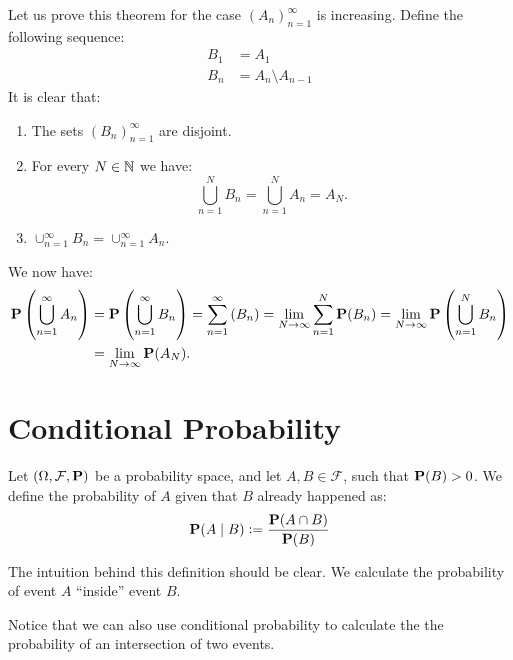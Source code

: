 \documentclass[11pt,a4paper]{article}
\begin{document}
  Let us prove this theorem for the case $(A_n)_{n=1}^{\infty}$ is increasing.
  Define the following sequence:
  \begin{align*}
    B_1 &= A_1 \\
    B_n &= A_n \setminus A_{n-1}
  \end{align*}
  It is clear that:
  \begin{enumerate}
    \item The sets $(B_n)_{n=1}^{\infty}$ are disjoint.
    \item For every $N \in \mathbb{N}$ we have: 
      \[ \bigcup_{n=1}^{N} B_n = \bigcup_{n=1}^{N} A_n = A_N. \]
    \item $\cup_{n=1}^{\infty} B_n = \cup_{n=1}^{\infty} A_n$.
  \end{enumerate}
  We now have:
  \begin{align*}
    \mathbf{P} \left(\bigcup_{n=1}^{\infty} A_n\right) &=
    \mathbf{P} \left(\bigcup_{n=1}^{\infty} B_n\right) =
    \sum_{n=1}^{\infty} \mathbf(B_n) =
    \lim_{N \to \infty} \sum_{n=1}^{N} \mathbf{P}(B_n) =
    \lim_{N \to \infty} \mathbf{P}\left(\bigcup_{n=1}^{N} B_n\right) \\ &=
    \lim_{N \to \infty} \mathbf{P}(A_N).
  \end{align*}

  \newpage

  \section{Conditional Probability}
  \begin{definition}
    Let $(\Omega, \mathcal F, \mathbf{P})$ be a probability space, and let
    $A,B \in \mathcal F$, such that $\mathbf{P}(B) > 0$. We define the
    probability of $A$ given that $B$ already happened as:
    \[
      \mathbf{P}(A \mid B) := \frac{\mathbf{P}(A \cap B)}{\mathbf{P}(B)}
    \]
  \end{definition}

  The intuition behind this definition should be clear. We calculate the 
  probability of event $A$ ``inside'' event $B$.

  Notice that we can also use conditional probability to calculate the
  the probability of an intersection of two events.
\end{document}
